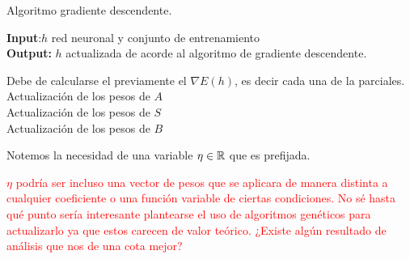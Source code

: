 \begin{algorithm}[H]
    \caption{Algoritmo gradiente descendente.}
    \hspace*{\algorithmicindent} \textbf{Input}:$h$ red neuronal  y conjunto de entrenamiento \\
    \hspace*{\algorithmicindent} \textbf{Output:} $h$ actualizada de acorde al algoritmo de gradiente descendente. 
    \begin{algorithmic}[1]
        \STATE Debe de calcularse el previamente el $\nabla E(h)$, es decir cada una de la parciales.
        \STATE Actualización de los pesos de $A$ \\  
        \STATE Actualización de los pesos de $S$ \\   
        \STATE Actualización de los pesos de $B$ \\ 
\end{algorithmic}
\end{algorithm}

Notemos la necesidad de una variable $\eta \in \mathbb{R}$ que es prefijada. 

\textcolor{red}{$\eta$ podría ser incluso una vector de pesos que se aplicara de manera distinta a cualquier coeficiente o una función variable de ciertas condiciones. No sé hasta qué punto sería interesante plantearse el uso de algoritmos genéticos para actualizarlo ya que estos carecen de valor teórico. ¿Existe algún resultado de análisis que nos de una cota mejor?}


